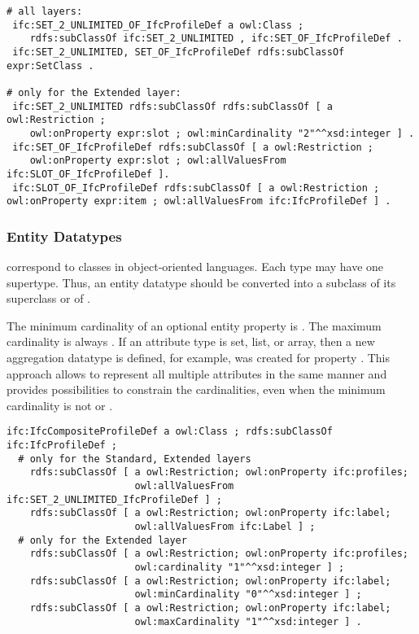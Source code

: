 \begin{lstlisting}
# all layers:
 ifc:SET_2_UNLIMITED_OF_IfcProfileDef a owl:Class ;
    rdfs:subClassOf ifc:SET_2_UNLIMITED , ifc:SET_OF_IfcProfileDef .
 ifc:SET_2_UNLIMITED, SET_OF_IfcProfileDef rdfs:subClassOf expr:SetClass .

# only for the Extended layer:
 ifc:SET_2_UNLIMITED rdfs:subClassOf rdfs:subClassOf [ a owl:Restriction ;
    owl:onProperty expr:slot ; owl:minCardinality "2"^^xsd:integer ] .
 ifc:SET_OF_IfcProfileDef rdfs:subClassOf [ a owl:Restriction ;
    owl:onProperty expr:slot ; owl:allValuesFrom ifc:SLOT_OF_IfcProfileDef ].
 ifc:SLOT_OF_IfcProfileDef rdfs:subClassOf [ a owl:Restriction ; owl:onProperty expr:item ; owl:allValuesFrom ifc:IfcProfileDef ] .
\end{lstlisting}




\subsubsection{Entity Datatypes} correspond to classes in object-oriented languages. Each type may have one super\-type. Thus, an entity data\-type should be converted into a subclass of its super\-class or of .

The minimum cardinality of an optional entity property is . The maximum cardinality is always . If an attribute type is set, list, or array, then a new aggregation data\-type is defined, for example,  was created for property . This approach allows to represent all multiple attributes in the same manner and provides possibilities to constrain the cardinalities, even when the minimum cardinality is not  or .



\begin{lstlisting}
ifc:IfcCompositeProfileDef a owl:Class ; rdfs:subClassOf ifc:IfcProfileDef ;
  # only for the Standard, Extended layers
    rdfs:subClassOf [ a owl:Restriction; owl:onProperty ifc:profiles;
                      owl:allValuesFrom ifc:SET_2_UNLIMITED_IfcProfileDef ] ;
    rdfs:subClassOf [ a owl:Restriction; owl:onProperty ifc:label;
                      owl:allValuesFrom ifc:Label ] ;
  # only for the Extended layer
    rdfs:subClassOf [ a owl:Restriction; owl:onProperty ifc:profiles;
                      owl:cardinality "1"^^xsd:integer ] ;
    rdfs:subClassOf [ a owl:Restriction; owl:onProperty ifc:label;
                      owl:minCardinality "0"^^xsd:integer ] ;
    rdfs:subClassOf [ a owl:Restriction; owl:onProperty ifc:label;
                      owl:maxCardinality "1"^^xsd:integer ] .
\end{lstlisting}



